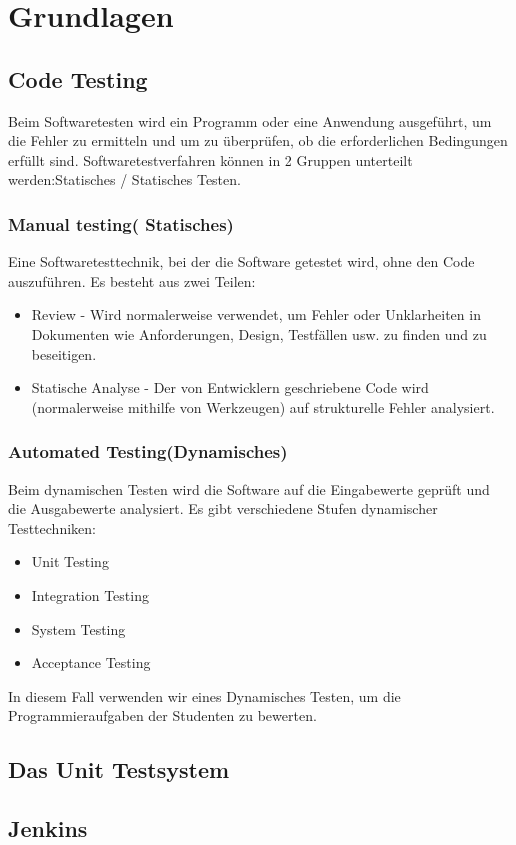 \documentclass[apaper4,12p]{scrartcl}
\begin{document}
\section{Grundlagen}
\subsection{Code Testing}
Beim Softwaretesten wird ein Programm oder eine Anwendung ausgeführt, um die Fehler zu ermitteln und um zu überprüfen, ob die erforderlichen Bedingungen erfüllt sind.
\newline
Softwaretestverfahren können in 2 Gruppen unterteilt werden:Statisches / Statisches Testen.
\subsubsection{Manual testing( Statisches)}
Eine Softwaretesttechnik, bei der die Software getestet wird, ohne den Code auszuführen. Es besteht aus zwei Teilen:
\begin{itemize}
	\item Review - Wird normalerweise verwendet, um Fehler oder Unklarheiten in Dokumenten wie Anforderungen, Design, Testfällen usw. zu finden und zu beseitigen.
	\item Statische Analyse - Der von Entwicklern geschriebene Code wird (normalerweise mithilfe von Werkzeugen) auf strukturelle Fehler analysiert. 
\end{itemize}
\subsubsection{Automated Testing(Dynamisches)}
Beim dynamischen Testen wird die Software auf die Eingabewerte geprüft und die Ausgabewerte analysiert. Es gibt verschiedene Stufen dynamischer Testtechniken: 
\begin{itemize}
	\item Unit Testing
	\item Integration Testing
	\item System Testing
	\item Acceptance Testing
\end{itemize}
In diesem Fall verwenden wir eines Dynamisches Testen, um die Programmieraufgaben der Studenten zu bewerten.
\subsection{Das Unit Testsystem}
\subsection{Jenkins}
\end{document}
